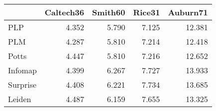 \begin{tabular}{lrrrr}
\toprule
{} & Caltech36 & Smith60 & Rice31 & Auburn71 \\
\midrule
PLP      &     4.352 &   5.790 &  7.125 &   12.381 \\
PLM      &     4.287 &   5.810 &  7.214 &   12.418 \\
Potts    &     4.447 &   5.810 &  7.216 &   12.652 \\
Infomap  &     4.399 &   6.267 &  7.727 &   13.933 \\
Surprise &     4.408 &   6.221 &  7.734 &   13.685 \\
Leiden   &     4.487 &   6.159 &  7.655 &   13.325 \\
\bottomrule
\end{tabular}

